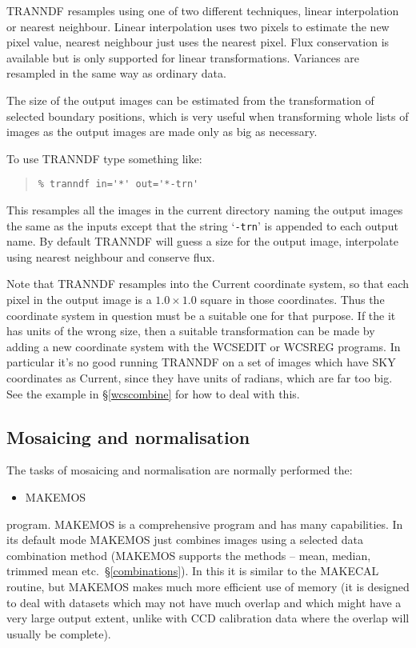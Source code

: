 \documentclass[twoside,11pt]{article}
\newcommand{\hyperref}[4]{#2\ref{#4}#3}
\newcommand{\htmlref}[2]{#1}
\newcommand{\xlabel}[1]{}
\renewcommand{\_}{\texttt{\symbol{95}}}
\newenvironment{myquote}{\begin{quote}\begin{small}}{\end{small}\end{quote}}
\newcommand{\text}[1]{{\small \tt #1}}
\newcommand{\routine}[1]{{\sc #1}}
\newcommand{\xroutine}[1]{\htmlref{{\sc #1}}{#1}}
\begin{document}
\routine{TRANNDF} resamples using 
one of two different techniques, linear interpolation
or nearest neighbour. Linear interpolation uses two pixels to estimate
the new pixel value, nearest neighbour just uses the nearest pixel. Flux
conservation is available but is only supported for linear
transformations. Variances are resampled in the same way as ordinary
data.

The size of the output images can be estimated from the transformation of
selected boundary positions, which is very useful when transforming whole
lists of images as the output images are made only as big as necessary.

To use \routine{TRANNDF} type something like:
\begin{myquote}
\begin{verbatim}
% tranndf in='*' out='*-trn'
\end{verbatim}
\end{myquote}
This resamples all the images in the current directory naming the output
images the same as the inputs except that the string `\text{-trn}' is
appended to each output name. 
By default \routine{TRANNDF} will guess a size for
the output image, interpolate using nearest neighbour and conserve flux.

Note that \routine{TRANNDF} resamples into the Current coordinate system,
so that each pixel in the output image is a $1.0 \times 1.0$ square 
in those coordinates.  Thus the coordinate system in question must be
a suitable one for that purpose.  If the it has units of 
the wrong size, then a suitable transformation can be made by
adding a new coordinate system with the
\xroutine{WCSEDIT} or \xroutine{WCSREG} programs.
In particular it's no good running \routine{TRANNDF} on a set of
images which have SKY coordinates as Current, since they have
units of radians, which are far too big.
See the example in \hyperref{the section about WCSREG}{\S }{}{wcscombine}
for how to deal with this.



\subsection{\xlabel{mosaic_normalise}\label{mos_norm}Mosaicing and 
            normalisation}

The tasks of mosaicing and normalisation are normally performed the:
\begin{itemize}
\item \xroutine{MAKEMOS}
\end{itemize}
program.
\routine{MAKEMOS} is a comprehensive program and has many
capabilities. In its default mode \routine{MAKEMOS} 
just combines images using a
selected data combination method (\routine{MAKEMOS} supports the
methods -- mean, median, trimmed mean etc.\ \S\ref{combinations}).
In this it is similar to the \xroutine{MAKECAL} routine, but
\routine{MAKEMOS} makes much more efficient use of
memory (it is designed to deal with datasets which may not have much
overlap and which might have a very large output extent, unlike with CCD
calibration data where the overlap will usually be complete).
\end{document}
